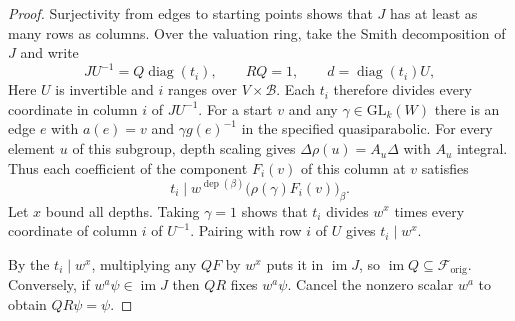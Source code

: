 \begin{proof}
Surjectivity from edges to starting points shows that $J$ has at least as many rows as columns. Over the valuation ring, take the Smith decomposition of $J$ and write
\[
 JU^{-1}=Q\operatorname{diag}(t_i),\qquad RQ=1,
 \qquad d=\operatorname{diag}(t_i)U ,
\]
Here $U$ is invertible and $i$ ranges over $V\times\mathcal B$. Each $t_i$ therefore divides every coordinate in column $i$ of $JU^{-1}$. For a start $v$ and any $\gamma\in\mathrm{GL}_k(W)$ there is an edge $e$ with $a(e)=v$ and $\gamma g(e)^{-1}$ in the specified quasiparabolic. For every element $u$ of this subgroup, depth scaling gives $\Delta\rho(u)=A_u\Delta$ with $A_u$ integral. Thus each coefficient of the component $F_i(v)$ of this column at $v$ satisfies
\[
 t_i\mid w^{\operatorname{dep}(\beta)}
               \bigl(\rho(\gamma)F_i(v)\bigr)_\beta .
\]
Let $x$ bound all depths. Taking $\gamma=1$ shows that $t_i$ divides $w^x$ times every coordinate of column $i$ of $U^{-1}$. Pairing with row $i$ of $U$ gives $t_i\mid w^x$.

By the $t_i\mid w^x$, multiplying any $QF$ by $w^x$ puts it in $\operatorname{im}J$, so $\operatorname{im}Q\subseteq\mathcal F_{\mathrm{orig}}$. Conversely, if $w^a\psi\in\operatorname{im}J$ then $QR$ fixes $w^a\psi$. Cancel the nonzero scalar $w^a$ to obtain $QR\psi=\psi$.


\end{proof}
